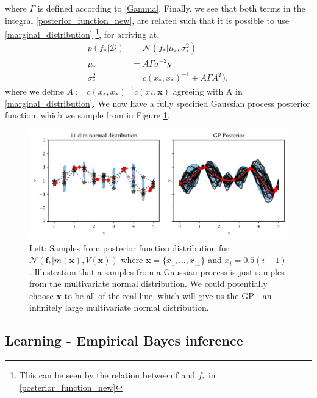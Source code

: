 where $\Gamma$ is defined according to \eqref{Gamma}. Finally, we see that both terms in the
integral \eqref{posterior_function_new}, are related such that it is possible to use
\eqref{marginal_distribution} \footnote{This can be seen by the relation between $\textbf{f}$ and
$f_*$ in \eqref{posterior_function_new}}, for arriving at, 
\begin{align*}
    p(f_*|\mathcal{D}) &= \mathcal{N}(f_*|\mu_*,\sigma_*^2 )\\
    \mu_* &=  A\Gamma\sigma^{-2}\textbf{y}\\
    \sigma_*^2 &=  c(x_*, x_*)^{-1}+A\Gamma A^T),
\end{align*}
where we define $A :=  c(x_*,x_*)^{-1} c(x_*, \textbf{x})$ agreeing with A in \eqref{marginal_distribution}.
We now have a fully specified Gaussian process posterior function, which we sample from 
in Figure \ref{GP_illustration2}. 


\begin{figure}[h]
    \centering
    \includegraphics[width = \textwidth]{Pictures/GP2_samples_mattern.pdf}
    \caption{Left: Samples from posterior function distribution for
    $\mathcal{N}(\textbf{f}_*|m(\textbf{x}),V(\textbf{x}))$ where $\textbf{x} = \{x_1,\dots, x_{11}\}$
    and $x_i= 0.5(i-1)$. Illustration that a samples from a Gaussian process is just samples from
    the multivariate normal distribution. We could potentially choose $\textbf{x}$ to be all of the
    real line, which will give us the GP - an infinitely large multivariate normal distribution.}
    \label{GP_illustration2}
\end{figure}





\subsection{Learning - Empirical Bayes inference}

